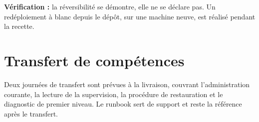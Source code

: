 \begin{encadre}
\textbf{Vérification :} la réversibilité se démontre, elle ne se déclare pas.
Un redéploiement à blanc depuis le dépôt, sur une machine neuve, est réalisé
pendant la recette.
\end{encadre}

\section{Transfert de compétences}
Deux journées de transfert sont prévues à la livraison, couvrant
l'administration courante, la lecture de la supervision, la procédure de
restauration et le diagnostic de premier niveau. Le runbook sert de support et
reste la référence après le transfert.
